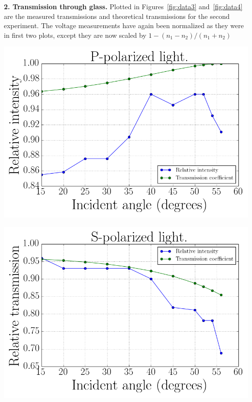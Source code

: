\documentclass{article}
\newenvironment{2colfig}{
  \par\medskip\noindent\minipage{\linewidth}
} {
  \endminipage\par\medskip
}
\begin{document}
\begin{multicols*}{2}
{\bf 2. Transmission through glass.} Plotted in Figures~\ref{fig:data3} and~\ref{fig:data4} are the measured
transmissions and theoretical transmissions for the second experiment. The voltage measurements have again been
normalized as they were in first two plots, except they are now scaled by $1 - (n_1 - n_2)/(n_1 + n_2)$ 
\begin{2colfig}
  \center
  \includegraphics[scale=.4]{data3}
  \label{fig:data3}
\end{2colfig}

\begin{2colfig}
  \center
  \includegraphics[scale=.4]{data4}
  \label{fig:data4}
\end{2colfig}


\end{multicols*}
\end{document}
